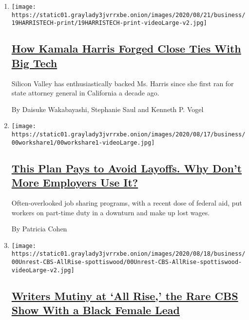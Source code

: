 \begin{enumerate}
\def\labelenumi{\arabic{enumi}.}
\item
  \texttt{[image: https://static01.graylady3jvrrxbe.onion/images/2020/08/21/business/19HARRISTECH-print/19HARRISTECH-print-videoLarge-v2.jpg]}

  \hypertarget{how-kamala-harris-forged-close-ties-with-big-tech}{%
  \subsection{\texorpdfstring{\href{/2020/08/20/technology/kamala-harris-ties-to-big-tech.html}{How
  Kamala Harris Forged Close Ties With Big
  Tech}}{How Kamala Harris Forged Close Ties With Big Tech}}\label{how-kamala-harris-forged-close-ties-with-big-tech}}

  Silicon Valley has enthusiastically backed Ms. Harris since she first
  ran for state attorney general in California a decade ago.

  By Daisuke Wakabayashi, Stephanie Saul and Kenneth P. Vogel
\item
  \texttt{[image: https://static01.graylady3jvrrxbe.onion/images/2020/08/17/business/00workshare1/00workshare1-videoLarge.jpg]}

  \hypertarget{this-plan-pays-to-avoid-layoffs-why-dont-more-employers-use-it}{%
  \subsection{\texorpdfstring{\href{/2020/08/20/business/economy/jobs-work-sharing-unemployment.html}{This
  Plan Pays to Avoid Layoffs. Why Don't More Employers Use
  It?}}{This Plan Pays to Avoid Layoffs. Why Don't More Employers Use It?}}\label{this-plan-pays-to-avoid-layoffs-why-dont-more-employers-use-it}}

  Often-overlooked job sharing programs, with a recent dose of federal
  aid, put workers on part-time duty in a downturn and make up lost
  wages.

  By Patricia Cohen
\item
  \texttt{[image: https://static01.graylady3jvrrxbe.onion/images/2020/08/18/business/00Unrest-CBS-AllRise-spottiswood/00Unrest-CBS-AllRise-spottiswood-videoLarge-v2.jpg]}

  \hypertarget{writers-mutiny-at-all-rise-the-rare-cbs-show-with-a-black-female-lead}{%
  \subsection{\texorpdfstring{\href{/2020/08/20/business/media/all-rise-cbs-writers.html}{Writers
  Mutiny at `All Rise,' the Rare CBS Show With a Black Female
  Lead}}{Writers Mutiny at `All Rise,' the Rare CBS Show With a Black Female Lead}}\label{writers-mutiny-at-all-rise-the-rare-cbs-show-with-a-black-female-lead}}


\end{enumerate}
